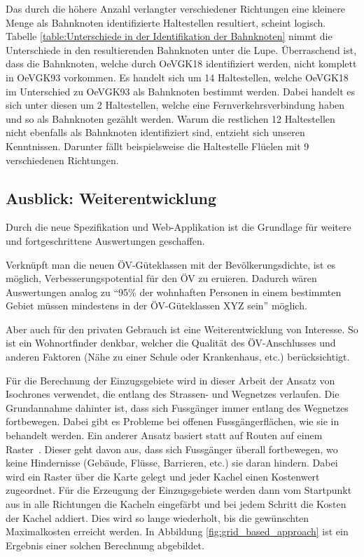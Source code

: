 Das durch die höhere Anzahl verlangter verschiedener Richtungen eine kleinere Menge als Bahnknoten identifizierte Haltestellen resultiert, scheint logisch.
Tabelle \ref{table:Unterschiede in der Identifikation der Bahnknoten} nimmt die Unterschiede in den resultierenden Bahnknoten unter die Lupe.
Überraschend ist, dass die Bahnknoten, welche durch OeVGK18 identifiziert werden, nicht komplett in OeVGK93 vorkommen.
Es handelt sich um 14 Haltestellen, welche OeVGK18 im Unterschied zu OeVGK93 als Bahnknoten bestimmt werden.
Dabei handelt es sich unter diesen um 2 Haltestellen, welche eine Fernverkehrsverbindung haben und so als Bahnknoten gezählt werden.
Warum die restlichen 12 Haltestellen nicht ebenfalls als Bahnknoten identifiziert sind, entzieht sich unseren Kenntnissen.
Darunter fällt beispielsweise die Haltestelle Flüelen mit 9 verschiedenen Richtungen.

\subsection{Ausblick: Weiterentwicklung}
\label{Resultate:Ausblick: Weiterentwicklung}

Durch die neue Spezifikation und Web-Applikation ist die Grundlage für weitere und fortgeschrittene Auswertungen geschaffen.

Verknüpft man die neuen \acs{ÖV}-Güteklassen mit der Bevölkerungsdichte, ist es möglich, Verbesserungspotential für den \acs{ÖV} zu eruieren.
Dadurch wären Auswertungen analog zu "`95\% der wohnhaften Personen in einem bestimmten Gebiet müssen mindestens in der \acs{ÖV}-Güteklassen XYZ sein"' möglich.

Aber auch für den privaten Gebrauch ist eine Weiterentwicklung von Interesse.
So ist ein Wohnortfinder denkbar, welcher die Qualität des \acs{ÖV}-Anschlusses und anderen Faktoren (Nähe zu einer Schule oder Krankenhaus, etc.) berücksichtigt.

Für die Berechnung der Einzugsgebiete wird in dieser Arbeit der Ansatz von \glspl{Isochrone} verwendet, die entlang des Strassen- und Wegnetzes verlaufen.
Die Grundannahme dahinter ist, dass sich Fussgänger immer entlang des Wegnetzes fortbewegen.
Dabei gibt es Probleme bei offenen Fussgängerflächen, wie sie in~\cite{plaza_route} behandelt werden.
Ein anderer Ansatz basiert statt auf Routen auf einem Raster~\cite{pedestrian_accessibility_planning}. Dieser geht davon aus, dass sich Fussgänger überall fortbewegen, wo keine Hindernisse (Gebäude, Flüsse, Barrieren, etc.) sie daran hindern.
Dabei wird ein Raster über die Karte gelegt und jeder Kachel einen Kostenwert zugeordnet.
Für die Erzeugung der Einzugsgebiete werden dann vom Startpunkt aus in alle Richtungen die Kacheln eingefärbt und bei jedem Schritt die Kosten der Kachel addiert.
Dies wird so lange wiederholt, bis die gewünschten Maximalkosten erreicht werden.
In Abbildung \ref{fig:grid_based_approach} ist ein Ergebnis einer solchen Berechnung abgebildet.

